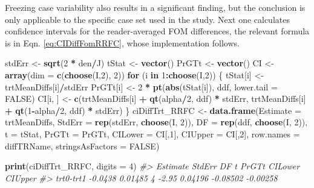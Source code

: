 \documentclass[
]{book}
\newenvironment{Shaded}{\begin{snugshade}}{\end{snugshade}}
\newcommand{\CommentTok}[1]{\textcolor[rgb]{0.56,0.35,0.01}{\textit{#1}}}
\newcommand{\ControlFlowTok}[1]{\textcolor[rgb]{0.13,0.29,0.53}{\textbf{#1}}}
\newcommand{\DataTypeTok}[1]{\textcolor[rgb]{0.13,0.29,0.53}{#1}}
\newcommand{\DecValTok}[1]{\textcolor[rgb]{0.00,0.00,0.81}{#1}}
\newcommand{\KeywordTok}[1]{\textcolor[rgb]{0.13,0.29,0.53}{\textbf{#1}}}
\newcommand{\NormalTok}[1]{#1}
\newcommand{\OperatorTok}[1]{\textcolor[rgb]{0.81,0.36,0.00}{\textbf{#1}}}
\newcommand{\OtherTok}[1]{\textcolor[rgb]{0.56,0.35,0.01}{#1}}
\newcommand{\StringTok}[1]{\textcolor[rgb]{0.31,0.60,0.02}{#1}}
\begin{document}
Freezing case variability also results in a significant finding, but the conclusion is only applicable to the specific case set used in the study. Next one calculates confidence intervals for the reader-averaged FOM differences, the relevant formula is in Eqn. \eqref{eq:CIDiffFomRRFC}, whose implementation follows.

\begin{Shaded}
\begin{Highlighting}[]
\NormalTok{stdErr <-}\StringTok{ }\KeywordTok{sqrt}\NormalTok{(}\DecValTok{2} \OperatorTok{*}\StringTok{ }\NormalTok{den}\OperatorTok{/}\NormalTok{J)}
\NormalTok{tStat <-}\StringTok{ }\KeywordTok{vector}\NormalTok{()}
\NormalTok{PrGTt <-}\StringTok{ }\KeywordTok{vector}\NormalTok{()}
\NormalTok{CI <-}\StringTok{ }\KeywordTok{array}\NormalTok{(}\DataTypeTok{dim =} \KeywordTok{c}\NormalTok{(}\KeywordTok{choose}\NormalTok{(I,}\DecValTok{2}\NormalTok{), }\DecValTok{2}\NormalTok{))}
\ControlFlowTok{for}\NormalTok{ (i }\ControlFlowTok{in} \DecValTok{1}\OperatorTok{:}\KeywordTok{choose}\NormalTok{(I,}\DecValTok{2}\NormalTok{)) \{}
\NormalTok{  tStat[i] <-}\StringTok{ }\NormalTok{trtMeanDiffs[i]}\OperatorTok{/}\NormalTok{stdErr}
\NormalTok{  PrGTt[i] <-}\StringTok{ }\DecValTok{2} \OperatorTok{*}\StringTok{ }
\StringTok{    }\KeywordTok{pt}\NormalTok{(}\KeywordTok{abs}\NormalTok{(tStat[i]), ddf, }\DataTypeTok{lower.tail =} \OtherTok{FALSE}\NormalTok{)}
\NormalTok{  CI[i, ] <-}\StringTok{ }\KeywordTok{c}\NormalTok{(trtMeanDiffs[i] }\OperatorTok{+}\StringTok{ }\KeywordTok{qt}\NormalTok{(alpha}\OperatorTok{/}\DecValTok{2}\NormalTok{, ddf) }\OperatorTok{*}\StringTok{ }\NormalTok{stdErr, }
\NormalTok{               trtMeanDiffs[i] }\OperatorTok{+}\StringTok{ }\KeywordTok{qt}\NormalTok{(}\DecValTok{1}\OperatorTok{-}\NormalTok{alpha}\OperatorTok{/}\DecValTok{2}\NormalTok{, ddf) }\OperatorTok{*}\StringTok{ }\NormalTok{stdErr)}
\NormalTok{\}}
\NormalTok{ciDiffTrt_RRFC <-}\StringTok{ }
\StringTok{  }\KeywordTok{data.frame}\NormalTok{(}\DataTypeTok{Estimate =}\NormalTok{ trtMeanDiffs, }
             \DataTypeTok{StdErr =} \KeywordTok{rep}\NormalTok{(stdErr, }\KeywordTok{choose}\NormalTok{(I, }\DecValTok{2}\NormalTok{)), }
             \DataTypeTok{DF =} \KeywordTok{rep}\NormalTok{(ddf, }\KeywordTok{choose}\NormalTok{(I, }\DecValTok{2}\NormalTok{)), }
             \DataTypeTok{t =}\NormalTok{ tStat, }
             \DataTypeTok{PrGTt =}\NormalTok{ PrGTt, }
             \DataTypeTok{CILower =}\NormalTok{ CI[,}\DecValTok{1}\NormalTok{],}
             \DataTypeTok{CIUpper =}\NormalTok{ CI[,}\DecValTok{2}\NormalTok{],}
             \DataTypeTok{row.names =}\NormalTok{ diffTRName, }
             \DataTypeTok{stringsAsFactors =} \OtherTok{FALSE}\NormalTok{)}

\KeywordTok{print}\NormalTok{(ciDiffTrt_RRFC, }\DataTypeTok{digits =} \DecValTok{4}\NormalTok{)}
\CommentTok{#>           Estimate  StdErr DF     t   PrGTt  CILower  CIUpper}
\CommentTok{#> trt0-trt1  -0.0438 0.01485  4 -2.95 0.04196 -0.08502 -0.00258}
\end{Highlighting}
\end{Shaded}
\end{document}
